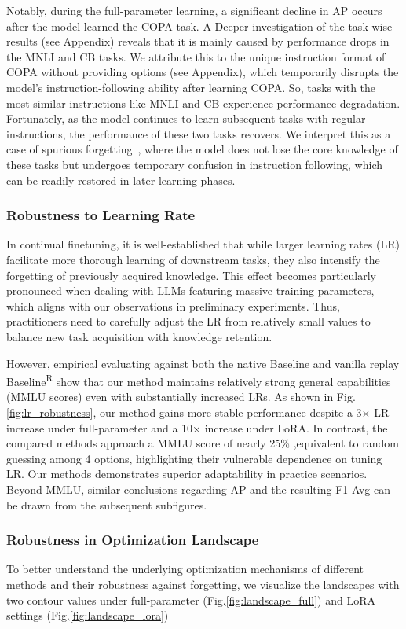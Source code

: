 Notably, during the full-parameter learning, a significant decline in AP occurs after the model learned the COPA task.
A Deeper investigation of the task-wise results (see Appendix) reveals that it is mainly caused by performance drops in the MNLI and CB tasks.
We attribute this to the unique instruction format of COPA without providing options (see Appendix), which temporarily disrupts the model's instruction-following ability after learning COPA.
So, tasks with the most similar instructions like MNLI and CB experience performance degradation.
Fortunately, as the model continues to learn subsequent tasks with regular instructions, the performance of these two tasks recovers. We interpret this as a case of spurious forgetting~\cite{zheng2025spurious}, where the model does not lose the core knowledge of these tasks but undergoes temporary confusion in instruction following, which can be readily restored in later learning phases.

\subsubsection{Robustness to Learning Rate}
In continual finetuning, it is well-established that while larger learning rates (LR) facilitate more thorough learning of downstream tasks, they also intensify the forgetting of previously acquired knowledge.
This effect becomes particularly pronounced when dealing with LLMs featuring massive training parameters, which aligns with our observations in preliminary experiments.
Thus, practitioners need to carefully adjust the LR from relatively small values to balance new task acquisition with knowledge retention. 

However, empirical evaluating against both the native Baseline and vanilla replay Baseline\textsuperscript{R} show that our method maintains relatively strong general capabilities (MMLU scores) even with substantially increased LRs.
As shown in Fig.\ref{fig:lr_robustness}, our method gains more stable performance despite a 3× LR increase under full-parameter and a 10× increase under LoRA.
In contrast, the compared methods approach a MMLU score of nearly 25\% ,equivalent to random guessing among 4 options, highlighting their vulnerable dependence on tuning LR.
Our methods demonstrates superior adaptability in practice scenarios.
Beyond MMLU, similar conclusions regarding AP and the resulting F1 Avg can be drawn from the subsequent subfigures.

\subsubsection{Robustness in Optimization Landscape}
To better understand the underlying optimization mechanisms of different methods and their robustness against forgetting, we visualize the landscapes with two contour values under full-parameter (Fig.\ref{fig:landscape_full}) and LoRA settings (Fig.\ref{fig:landscape_lora})

